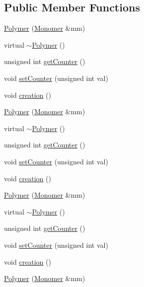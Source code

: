\subsection*{Public Member Functions}
\begin{DoxyCompactItemize}
\item 
\mbox{\hyperlink{classPolymer_ae77454a3908652e4df6a26b9cac509a5}{Polymer}} (\mbox{\hyperlink{classMonomer}{Monomer}} \&mm)
\item 
virtual \mbox{\hyperlink{classPolymer_aac2b3983f375a5691c7d5ca1a79594d5}{$\sim$\+Polymer}} ()
\item 
unsigned int \mbox{\hyperlink{classPolymer_a8346d821e5f8690d7816ba1d40036b69}{get\+Counter}} ()
\item 
void \mbox{\hyperlink{classPolymer_a7ed6bbe09a570b59f9253d63fd3326d2}{set\+Counter}} (unsigned int val)
\item 
void \mbox{\hyperlink{classPolymer_a1daba3eb2ba8428bf2f3e814668b155f}{creation}} ()
\item 
\mbox{\hyperlink{classPolymer_ae77454a3908652e4df6a26b9cac509a5}{Polymer}} (\mbox{\hyperlink{classMonomer}{Monomer}} \&mm)
\item 
virtual \mbox{\hyperlink{classPolymer_aac2b3983f375a5691c7d5ca1a79594d5}{$\sim$\+Polymer}} ()
\item 
unsigned int \mbox{\hyperlink{classPolymer_a8346d821e5f8690d7816ba1d40036b69}{get\+Counter}} ()
\item 
void \mbox{\hyperlink{classPolymer_a7ed6bbe09a570b59f9253d63fd3326d2}{set\+Counter}} (unsigned int val)
\item 
void \mbox{\hyperlink{classPolymer_a1daba3eb2ba8428bf2f3e814668b155f}{creation}} ()
\item 
\mbox{\hyperlink{classPolymer_ae77454a3908652e4df6a26b9cac509a5}{Polymer}} (\mbox{\hyperlink{classMonomer}{Monomer}} \&mm)
\item 
virtual \mbox{\hyperlink{classPolymer_aac2b3983f375a5691c7d5ca1a79594d5}{$\sim$\+Polymer}} ()
\item 
unsigned int \mbox{\hyperlink{classPolymer_a8346d821e5f8690d7816ba1d40036b69}{get\+Counter}} ()
\item 
void \mbox{\hyperlink{classPolymer_a7ed6bbe09a570b59f9253d63fd3326d2}{set\+Counter}} (unsigned int val)
\item 
void \mbox{\hyperlink{classPolymer_a1daba3eb2ba8428bf2f3e814668b155f}{creation}} ()
\item 
\mbox{\hyperlink{classPolymer_ae77454a3908652e4df6a26b9cac509a5}{Polymer}} (\mbox{\hyperlink{classMonomer}{Monomer}} \&mm)

\end{DoxyCompactItemize}
